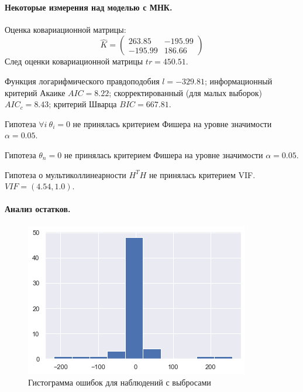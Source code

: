 \documentclass[a4paper,12pt]{article}
\begin{document}
\paragraph{Некоторые измерения над моделью с МНК.\\}
Оценка ковариационной матрицы:
$$ \hat{K} = 
\begin{pmatrix}
    263.85 & -195.99\\
    -195.99 & 186.66
\end{pmatrix}
$$
След оценки ковариационной матрицы $tr = 450.51$.

Функция логарифмического правдоподобия $l = -329.81$; информационный критерий Акаике $AIC = 8.22$; скорректированный (для малых выборок) $AIC_c = 8.43$; критерий Шварца $BIC = 667.81$.

Гипотеза $\forall i~\theta_i=0$ не принялась критерием Фишера на уровне значимости $\alpha = 0.05$.

Гипотеза $\theta_n = 0$ не принялась критерием Фишера на уровне значимости $\alpha = 0.05$.

Гипотеза о мультиколлинеарности $H^T H$ не принялась критерием VIF. $VIF = (4.54, 1.0)$.


\paragraph{Анализ остатков.\\}
\begin{figure}
    \vspace{-2ex}
    \includegraphics[width=\linewidth]{src/img/гистограмма_ошибок_наблюдения_с_выбросами.png}
    \caption{Гистограмма ошибок для наблюдений с выбросами}
\end{figure}
\end{document}

